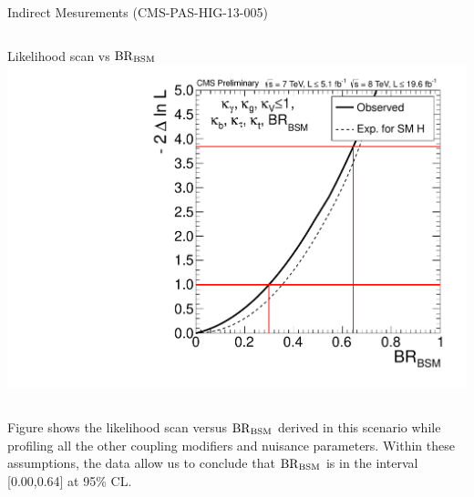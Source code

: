 \documentclass[8pt]{beamer}
\begin{document}
\begin{frame}{Indirect Mesurements (CMS-PAS-HIG-13-005)}
\begin{columns}
\begin{block}{Likelihood scan vs $\rm{BR}_{\rm{BSM}}$}
\includegraphics[width=\textwidth]{img/sqr_BRiC7_scan_1d_comb_comp.pdf}

\end{block}

\end{columns}

Figure shows the likelihood scan versus $\rm{BR}_{\rm{BSM}}$ derived in this scenario 
while profiling all the other coupling modifiers and nuisance parameters.
Within these assumptions, the data allow us to conclude that $\rm{BR}_{\rm{BSM}}$ is in the interval [0.00,0.64] at 95\% CL.

\end{frame}
\end{document}
